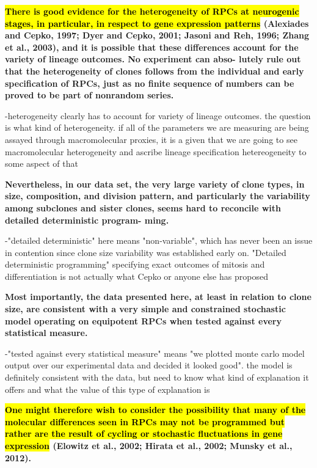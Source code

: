 \bigskip

\textbf{\hl{
There is good evidence for the
heterogeneity of RPCs at neurogenic stages, in particular, in
respect to gene expression patterns} (Alexiades and Cepko,
1997; Dyer and Cepko, 2001; Jasoni and Reh, 1996; Zhang
et al., 2003), and it is possible that these differences account
for the variety of lineage outcomes. No experiment can abso-
lutely rule out that the heterogeneity of clones follows from the
individual and early specification of RPCs, just as no finite
sequence of numbers can be proved to be part of nonrandom
series.}

\bigskip

-heterogeneity clearly has to account for variety of lineage outcomes. the question is what kind of heterogeneity. if all of the parameters we are measuring are being assayed through macromolecular proxies, it is a given that we are going to see macromolecular heterogeneity and ascribe lineage specification hetereogeneity to some aspect of that

\bigskip

\textbf{ Nevertheless, in our data set, the very large variety of
clone types, in size, composition, and division pattern, and
particularly the variability among subclones and sister clones,
seems hard to reconcile with detailed deterministic program-
ming.}

\bigskip

-"detailed deterministic" here means "non-variable", which has never been an issue in contention since clone size variability was established early on. "Detailed deterministic programming" specifying exact outcomes of mitosis and differentiation is not actually what Cepko or anyone else has proposed

\bigskip

 \textbf{Most importantly, the data presented here, at least in
relation to clone size, are consistent with a very simple and
constrained stochastic model operating on equipotent RPCs
when tested against every statistical measure.}

\bigskip

-"tested against every statistical measure" means "we plotted monte carlo model output over our experimental data and decided it looked good". the model is definitely consistent with the data, but need to know what kind of explanation it offers and what the value of this type of explanation is

\bigskip

\textbf{\hl{
 One might
therefore wish to consider the possibility that many of the
molecular differences seen in RPCs may not be programmed
but rather are the result of cycling or stochastic fluctuations in
gene expression }(Elowitz et al., 2002; Hirata et al., 2002; Munsky
et al., 2012).}

